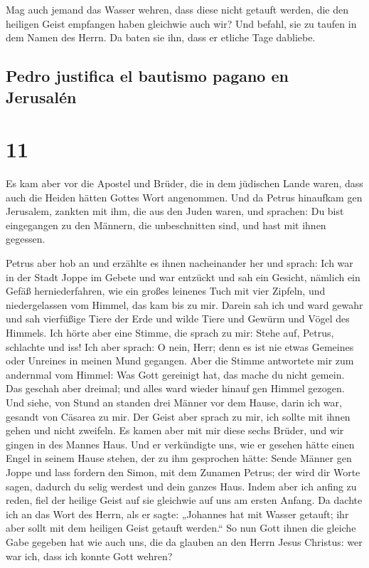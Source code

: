  Mag auch jemand das Wasser wehren, dass diese nicht
getauft werden, die den heiligen Geist empfangen haben gleichwie auch
wir?  Und befahl, sie zu taufen in dem Namen des Herrn.
Da baten sie ihn, dass er etliche Tage dabliebe.

\hypertarget{pedro-justifica-el-bautismo-pagano-en-jerusaluxe9n}{%
\subsection{Pedro justifica el bautismo pagano en
Jerusalén}\label{pedro-justifica-el-bautismo-pagano-en-jerusaluxe9n}}

\hypertarget{section-10}{%
\section{11}\label{section-10}}

 Es kam aber vor die Apostel und Brüder, die in dem
jüdischen Lande waren, dass auch die Heiden hätten Gottes Wort
angenommen.  Und da Petrus hinaufkam gen Jerusalem,
zankten mit ihm, die aus den Juden waren,  und sprachen:
Du bist eingegangen zu den Männern, die unbeschnitten sind, und hast mit
ihnen gegessen.

 Petrus aber hob an und erzählte es ihnen nacheinander her
und sprach:  Ich war in der Stadt Joppe im Gebete und war
entzückt und sah ein Gesicht, nämlich ein Gefäß herniederfahren, wie ein
großes leinenes Tuch mit vier Zipfeln, und niedergelassen vom Himmel,
das kam bis zu mir.  Darein sah ich und ward gewahr und
sah vierfüßige Tiere der Erde und wilde Tiere und Gewürm und Vögel des
Himmels.  Ich hörte aber eine Stimme, die sprach zu mir:
Stehe auf, Petrus, schlachte und iss!  Ich aber sprach: O
nein, Herr; denn es ist nie etwas Gemeines oder Unreines in meinen Mund
gegangen.  Aber die Stimme antwortete mir zum andernmal
vom Himmel: Was Gott gereinigt hat, das mache du nicht gemein.
 Das geschah aber dreimal; und alles ward wieder hinauf
gen Himmel gezogen.  Und siehe, von Stund an standen drei
Männer vor dem Hause, darin ich war, gesandt von Cäsarea zu mir.
 Der Geist aber sprach zu mir, ich sollte mit ihnen gehen
und nicht zweifeln. Es kamen aber mit mir diese sechs Brüder, und wir
gingen in des Mannes Haus.  Und er verkündigte uns, wie
er gesehen hätte einen Engel in seinem Hause stehen, der zu ihm
gesprochen hätte: Sende Männer gen Joppe und lass fordern den Simon, mit
dem Zunamen Petrus;  der wird dir Worte sagen, dadurch du
selig werdest und dein ganzes Haus.  Indem aber ich
anfing zu reden, fiel der heilige Geist auf sie gleichwie auf uns am
ersten Anfang.  Da dachte ich an das Wort des Herrn, als
er sagte: „Johannes hat mit Wasser getauft; ihr aber sollt mit dem
heiligen Geist getauft werden.``  So nun Gott ihnen die
gleiche Gabe gegeben hat wie auch uns, die da glauben an den Herrn Jesus
Christus: wer war ich, dass ich konnte Gott wehren?

